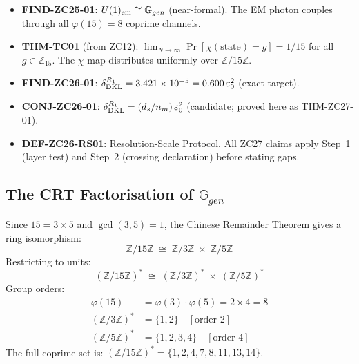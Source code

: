 \documentclass[12pt, a4paper]{article}
\begin{document}
\begin{formalbox}[title={Inherited Results Used by ZC27}]
\begin{itemize}[leftmargin=*, noitemsep]
  \item \textbf{FIND-ZC25-01}: $U(1)_{\rm em} \cong \mathbb{G}_{gen}$
    (near-formal). The EM photon couples through all
    $\varphi(15) = 8$ coprime channels.
  \item \textbf{THM-TC01} (from ZC12): $\lim_{N\to\infty}
    \Pr[\chi(\text{state}) = g] = 1/15$ for all $g \in \mathbb{Z}_{15}$.
    The $\chi$-map distributes uniformly over $\mathbb{Z}/15\mathbb{Z}$.
  \item \textbf{FIND-ZC26-01}:
    $\delta_{\rm DKL}^{R_1} = 3.421\times10^{-5}
    = 0.600\,\varepsilon_0^2$ (exact target).
  \item \textbf{CONJ-ZC26-01}:
    $\delta_{\rm DKL}^{R_1} = (d_s/n_m)\,\varepsilon_0^2$
    (candidate; proved here as THM-ZC27-01).
  \item \textbf{DEF-ZC26-RS01}: Resolution-Scale Protocol.
    All ZC27 claims apply Step~1 (layer test) and
    Step~2 (crossing declaration) before stating gaps.
\end{itemize}
\end{formalbox}

\subsection{The CRT Factorisation of $\mathbb{G}_{gen}$}
\label{zc27:sec:crt}

\begin{derivedbox}[title={FIND-ZC27-01: CRT Partition of
  $(\mathbb{Z}/15\mathbb{Z})^*$}]
Since $15 = 3 \times 5$ and $\gcd(3,5) = 1$, the Chinese
Remainder Theorem gives a ring isomorphism:
\[
  \mathbb{Z}/15\mathbb{Z}
  \;\cong\;
  \mathbb{Z}/3\mathbb{Z} \;\times\; \mathbb{Z}/5\mathbb{Z}
\]
Restricting to units:
\[
  (\mathbb{Z}/15\mathbb{Z})^*
  \;\cong\;
  (\mathbb{Z}/3\mathbb{Z})^* \;\times\; (\mathbb{Z}/5\mathbb{Z})^*
  \tag{ZC27-CRT}\label{zc27:eq:crt}
\]
Group orders:
\begin{align}
  \varphi(15) &= \varphi(3)\cdot\varphi(5) = 2 \times 4 = 8
  \tag{ZC27-PHI}\\
  (\mathbb{Z}/3\mathbb{Z})^* &= \{1, 2\}
    \quad [\text{order }2] \\
  (\mathbb{Z}/5\mathbb{Z})^* &= \{1, 2, 3, 4\}
    \quad [\text{order }4]
\end{align}
The full coprime set is:
$(\mathbb{Z}/15\mathbb{Z})^* = \{1, 2, 4, 7, 8, 11, 13, 14\}$.
\end{derivedbox}
\end{document}
